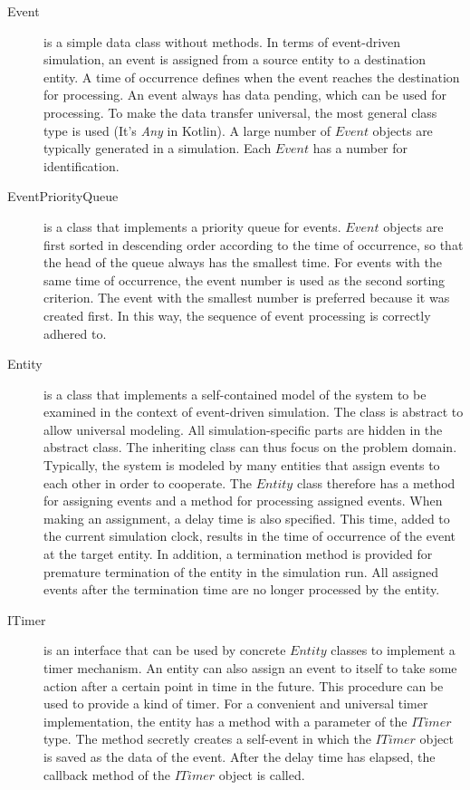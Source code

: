 \documentclass[english,version-2019-11]{uzl-thesis}
\begin{document}
\begin{description}
\item [Event]
 is a simple data class without methods. In terms of event-driven simulation, an event is assigned from a source entity to a destination entity. A time of occurrence defines when the event reaches the destination for processing. An event always has data pending, which can be used for processing. To make the data transfer universal, the most general class type is used (It's \emph{Any} in Kotlin). A large number of $Event$ objects are typically generated in a simulation. Each $Event$ has a number for identification.
\item [EventPriorityQueue]
is a class that implements a priority queue for events. $Event$ objects are first sorted in descending order according to the time of occurrence, so that the head of the queue always has the smallest time. For events with the same time of occurrence, the event number is used as the second sorting criterion. The event with the smallest number is preferred because it was created first. In this way, the sequence of event processing is correctly adhered to.
\item [Entity]
is a class that implements a self-contained model of the system to be examined in the context of event-driven simulation. The class is abstract to allow universal modeling. All simulation-specific parts are hidden in the abstract class. The inheriting class can thus focus on the problem domain. Typically, the system is modeled by many entities that assign events to each other in order to cooperate. The $Entity$ class therefore has a method for assigning events and a method for processing assigned events. When making an assignment, a delay time is also specified. This time, added to the current simulation clock, results in the time of occurrence of the event at the target entity. In addition, a termination method is provided for premature termination of the entity in the simulation run. All assigned events after the termination time are no longer processed by the entity.
\item [ITimer]
is an interface that can be used by concrete $Entity$ classes to implement a timer mechanism.
An entity can also assign an event to itself to take some action after a certain point in time in the future. This procedure can be used to provide a kind of timer. For a convenient and universal timer implementation, the entity has a method with a parameter of the $ITimer$ type. The method secretly creates a self-event in which the $ITimer$ object is saved as the data of the event. After the delay time has elapsed, the callback method of the $ITimer$ object is called.

\end{description}
\end{document}
